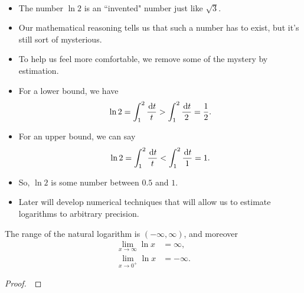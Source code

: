 \newpage

\begin{remark}\,
\begin{itemize}
\item The number $\ln 2$ is an ``invented" number just like $\sqrt 3$.
\item Our mathematical reasoning tells us that such a number has to exist, but it's still sort of mysterious.
\item To help us feel more comfortable, we remove some of the mystery by estimation.
\item For a lower bound, we have
    \begin{equation*}
        \ln 2 
		= \int_{1}^{2} \frac{\mkern 2mu \mathrm{d} t}{t} 
		>\int_1^2\frac{\mkern 2mu \mathrm{d} t}{2}
		= \frac{1}{2}.
    \end{equation*} 
\item For an upper bound, we can say
    \begin{equation*}
        \ln 2 
		= \int_{1}^{2} \frac{\mkern 2mu \mathrm{d} t}{t} 
		<\int_1^2\frac{\mkern 2mu \mathrm{d} t}{1}
		= 1.
    \end{equation*} 
\item So, $\ln 2$ is some number between $0.5$ and $1$.
\item Later will develop numerical techniques that will allow us to estimate logarithms to arbitrary precision.
\end{itemize}
\end{remark}

\begin{theorem}
The range of the natural logarithm is $(-\infty, \infty)$, and moreover
\begin{align*}
\lim_{x\to \infty}\ln x &= \infty,\\
\lim_{x\to 0^+}\ln x &=-\infty.
\end{align*}
\end{theorem}

\ifdefined\SOLUTION
{}
\else
\begin{proof}\,

\vspace{2.5in}
\end{proof}
\fi




